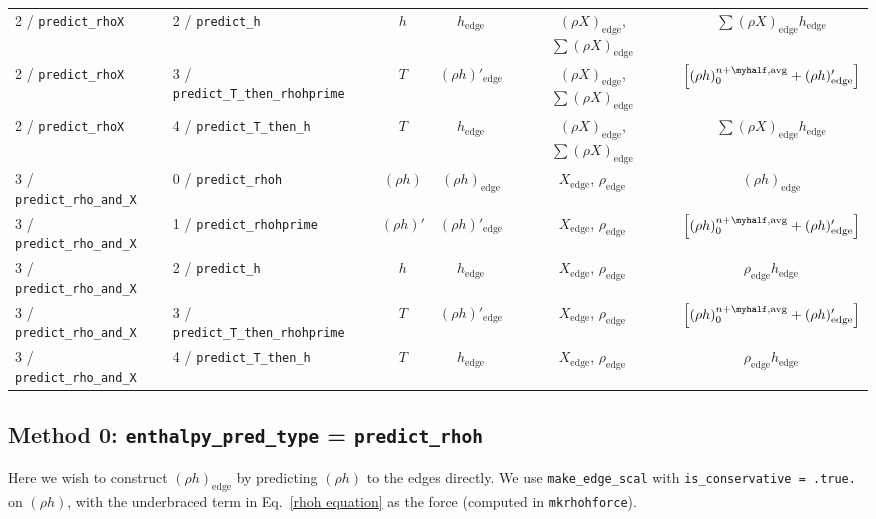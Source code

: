 \begin{landscape}
\begin{table}[t]
{\begin{tabular}{l|l|c|c|c|c}
2 / {\tt predict\_rhoX}  & 2 / {\tt predict\_h} &
  $h$ & $h_\mathrm{edge}$ & 
  $(\rho X)_\mathrm{edge}$, $\sum(\rho X)_\mathrm{edge}$ & 
  $\sum(\rho X)_\mathrm{edge} h_\mathrm{edge}$ \\
2 / {\tt predict\_rhoX}  & 3 / {\tt predict\_T\_then\_rhohprime} &
  $T$ & $(\rho h)'_\mathrm{edge}$ & 
  $(\rho X)_\mathrm{edge}$, $\sum(\rho X)_\mathrm{edge}$ & 
  $\left [ (\rho h)_0^{n+\myhalf,{\rm avg}} + (\rho h)'_\mathrm{edge} \right ]$ \\
2 / {\tt predict\_rhoX}  & 4 / {\tt predict\_T\_then\_h} &
  $T$ & $h_\mathrm{edge}$ & 
  $(\rho X)_\mathrm{edge}$, $\sum(\rho X)_\mathrm{edge}$ & 
  $\sum(\rho X)_\mathrm{edge} h_\mathrm{edge}$ \\
\hline
\hline
3 / {\tt predict\_rho\_and\_X}  & 0 / {\tt predict\_rhoh} &
  $(\rho h)$ & $(\rho h)_\mathrm{edge}$ & 
  $X_\mathrm{edge}$, $\rho_\mathrm{edge}$ & 
  $(\rho h)_\mathrm{edge}$ \\
3 / {\tt predict\_rho\_and\_X}  & 1 / {\tt predict\_rhohprime} &
  $(\rho h)'$ & $(\rho h)'_\mathrm{edge}$ & 
  $X_\mathrm{edge}$, $\rho_\mathrm{edge}$ & 
  $\left [ (\rho h)_0^{n+\myhalf,{\rm avg}} + (\rho h)'_\mathrm{edge} \right ]$ \\
3 / {\tt predict\_rho\_and\_X}  & 2 / {\tt predict\_h} &
  $h$ & $h_\mathrm{edge}$ & 
  $X_\mathrm{edge}$, $\rho_\mathrm{edge}$ & 
  $\rho_\mathrm{edge} h_\mathrm{edge}$ \\
3 / {\tt predict\_rho\_and\_X}  & 3 / {\tt predict\_T\_then\_rhohprime} &
  $T$ & $(\rho h)'_\mathrm{edge}$ & 
  $X_\mathrm{edge}$, $\rho_\mathrm{edge}$ & 
  $\left [ (\rho h)_0^{n+\myhalf,{\rm avg}} + (\rho h)'_\mathrm{edge} \right ]$ \\
3 / {\tt predict\_rho\_and\_X}  & 4 / {\tt predict\_T\_then\_h} &
  $T$ & $h_\mathrm{edge}$ & 
  $X_\mathrm{edge}$, $\rho_\mathrm{edge}$ & 
  $\rho_\mathrm{edge} h_\mathrm{edge}$ \\
\hline
\end{tabular}
} %
\end{table}
\end{landscape}


\subsection{Method 0: {\tt enthalpy\_pred\_type} = {\tt predict\_rhoh}}

Here we wish to construct $(\rho h)_\mathrm{edge}$ by predicting
$(\rho h)$ to the edges directly.  We use {\tt make\_edge\_scal} with
{\tt is\_conservative = .true.} on $(\rho h)$, with the underbraced term
in Eq.~\ref{rhoh equation} as the force (computed in {\tt mkrhohforce}).



